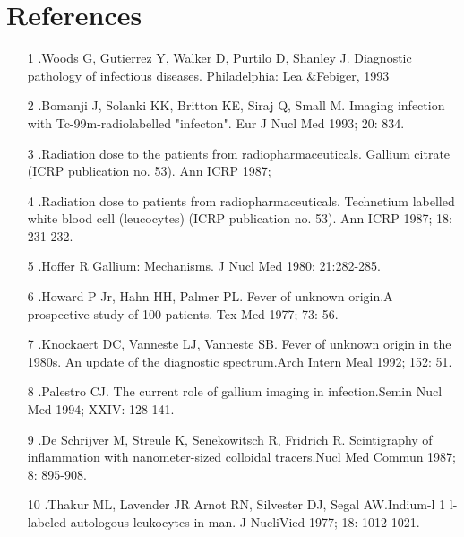\documentclass[12pt]{article}
\begin{document}
\section*{References}
\begin{itemize}
\item [1].Woods G, Gutierrez Y, Walker D, Purtilo D, Shanley J. Diagnostic pathology of infectious diseases. Philadelphia: Lea &Febiger, 1993
\item [2].Bomanji J, Solanki KK, Britton KE, Siraj Q, Small M. Imaging infection with Tc-99m-radiolabelled "infecton". Eur J Nucl Med 1993; 20: 834.
\item [3].Radiation dose to the patients from radiopharmaceuticals. Gallium citrate (ICRP publication no. 53). Ann ICRP 1987;
\item [4].Radiation dose to patients from radiopharmaceuticals. Technetium labelled white blood cell (leucocytes) (ICRP publication no. 53). Ann ICRP 1987; 18: 231-232.
\item [5].Hoffer R Gallium: Mechanisms. J Nucl Med 1980; 21:282-285.
\item [6].Howard P Jr, Hahn HH, Palmer PL. Fever of unknown origin.A prospective study of 100 patients. Tex Med 1977; 73: 56.
\item [7].Knockaert DC, Vanneste LJ, Vanneste SB. Fever of unknown origin in the 1980s. An update of the diagnostic spectrum.Arch Intern Meal 1992; 152: 51.
\item [8].Palestro CJ. The current role of gallium imaging in infection.Semin Nucl Med 1994; XXIV: 128-141.
\item [9].De Schrijver M, Streule K, Senekowitsch R, Fridrich R. Scintigraphy of inflammation with nanometer-sized colloidal tracers.Nucl Med Commun 1987; 8: 895-908.
\item [10].Thakur ML, Lavender JR Arnot RN, Silvester DJ, Segal AW.Indium-l 1 l-labeled autologous leukocytes in man. J NucliVied 1977; 18: 1012-1021.


\end{itemize}






 
\end{document}
